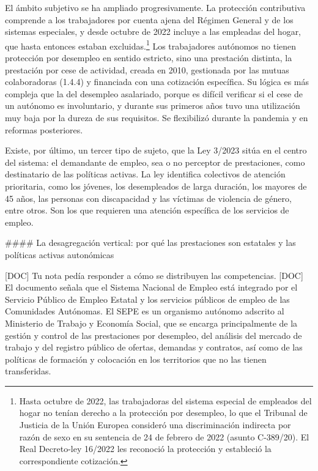\documentclass[10pt,a4paper]{article}
\begin{document}
El ámbito subjetivo se ha ampliado progresivamente. La protección contributiva comprende a los trabajadores por cuenta ajena del Régimen General y de los sistemas especiales, y desde octubre de 2022 incluye a las empleadas del hogar, que hasta entonces estaban excluidas.\footnote{%
    Hasta octubre de 2022, las trabajadoras del sistema especial de empleados del hogar no tenían derecho a la protección por desempleo, lo que el Tribunal de Justicia de la Unión Europea consideró una discriminación indirecta por razón de sexo en su sentencia de 24 de febrero de 2022 (asunto C-389/20). El Real Decreto-ley 16/2022 les reconoció la protección y estableció la correspondiente cotización.
} Los trabajadores autónomos no tienen protección por desempleo en sentido estricto, sino una prestación distinta, la prestación por cese de actividad, creada en 2010, gestionada por las mutuas colaboradoras (1.4.4) y financiada con una cotización específica. Su lógica es más compleja que la del desempleo asalariado, porque es difícil verificar si el cese de un autónomo es involuntario, y durante sus primeros años tuvo una utilización muy baja por la dureza de sus requisitos. Se flexibilizó durante la pandemia y en reformas posteriores.

Existe, por último, un tercer tipo de sujeto, que la Ley 3/2023 sitúa en el centro del sistema: el demandante de empleo, sea o no perceptor de prestaciones, como destinatario de las políticas activas. La ley identifica colectivos de atención prioritaria, como los jóvenes, los desempleados de larga duración, los mayores de 45 años, las personas con discapacidad y las víctimas de violencia de género, entre otros. Son los que requieren una atención específica de los servicios de empleo.

#### La desagregación vertical: por qué las prestaciones son estatales y las políticas activas autonómicas

[DOC] Tu nota pedía responder a cómo se distribuyen las competencias. [DOC] El documento señala que el Sistema Nacional de Empleo está integrado por el Servicio Público de Empleo Estatal y los servicios públicos de empleo de las Comunidades Autónomas. El SEPE es un organismo autónomo adscrito al Ministerio de Trabajo y Economía Social, que se encarga principalmente de la gestión y control de las prestaciones por desempleo, del análisis del mercado de trabajo y del registro público de ofertas, demandas y contratos, así como de las políticas de formación y colocación en los territorios que no las tienen transferidas.
\end{document}
